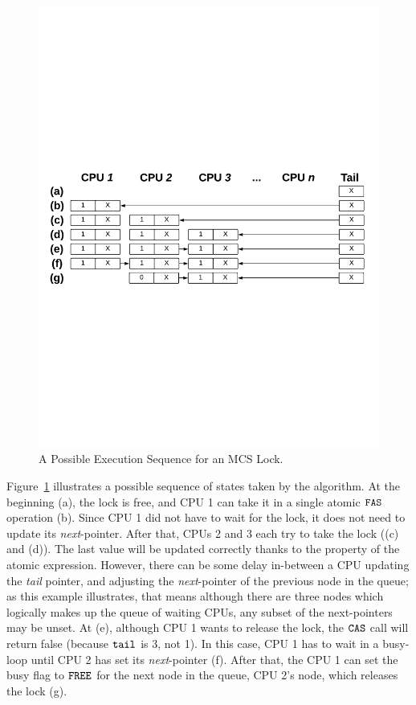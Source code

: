 \begin{figure}
\begin{center}
\includegraphics[width=0.9\linewidth]{figs/mcslock/mcsex}
\end{center}
\caption{A Possible Execution Sequence for an MCS Lock.}
\label{fig:chapter:mcslock:mcs-example}
\end{figure}

Figure~\ref{fig:chapter:mcslock:mcs-example} illustrates a possible sequence of states taken by the algorithm. 
At the beginning (a), the lock is free, and CPU 1 can take it in a single atomic ${\mathrm{\texttt{FAS}}}$ operation (b).
Since CPU 1 did not have to wait for the lock, it does not need to update its \emph{next}-pointer. 
After that, CPUs 2 and 3 each try to take the lock ((c) and (d)). 
The last value will be updated correctly thanks to the property of the atomic expression.
However, there can be some delay in-between a CPU updating the \emph{tail} pointer, and adjusting the \emph{next}-pointer of the previous node in the queue; as this example illustrates, that means although there are three nodes which logically makes up the queue of waiting CPUs, any subset of the next-pointers may be unset. 
At (e), although CPU 1 wants to release the lock, the ${\mathrm{\texttt{CAS}}}$
call will return false (because ${\mathrm{\texttt{tail}}}$ is 3, not 1).
In this case, CPU 1 has to wait in a busy-loop until CPU 2 has set its \emph{next}-pointer (f).
After that, the CPU 1 can set the busy flag to ${\mathrm{\texttt{FREE}}}$ for the next node in the queue, CPU 2's node, which releases the lock (g).

